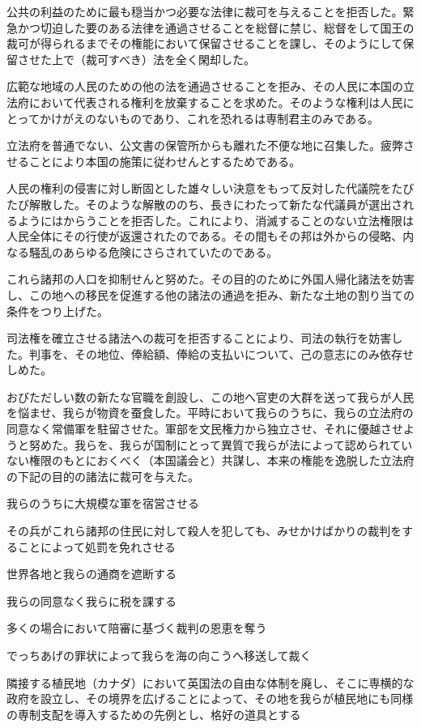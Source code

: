 公共の利益のために最も穏当かつ必要な法律に裁可を与えることを拒否した。緊急かつ切迫した要のある法律を通過させることを総督に禁じ、総督をして国王の裁可が得られるまでその権能において保留させることを課し、そのようにして保留させた上で（裁可すべき）法を全く閑却した。

広範な地域の人民のための他の法を通過させることを拒み、その人民に本国の立法府において代表される権利を放棄することを求めた。そのような権利は人民にとってかけがえのないものであり、これを恐れるは専制君主のみである。

立法府を普通でない、公文書の保管所からも離れた不便な地に召集した。疲弊させることにより本国の施策に従わせんとするためである。

人民の権利の侵害に対し断固とした雄々しい決意をもって反対した代議院をたびたび解散した。そのような解散ののち、長きにわたって新たな代議員が選出されるようにはからうことを拒否した。これにより、消滅することのない立法権限は人民全体にその行使が返還されたのである。その間もその邦は外からの侵略、内なる騒乱のあらゆる危険にさらされていたのである。

これら諸邦の人口を抑制せんと努めた。その目的のために外国人帰化諸法を妨害し、この地への移民を促進する他の諸法の通過を拒み、新たな土地の割り当ての条件をつり上げた。

司法権を確立させる諸法への裁可を拒否することにより、司法の執行を妨害した。判事を、その地位、俸給額、俸給の支払いについて、己の意志にのみ依存せしめた。

おびただしい数の新たな官職を創設し、この地へ官吏の大群を送って我らが人民を悩ませ、我らが物資を蚕食した。平時において我らのうちに、我らの立法府の同意なく常備軍を駐留させた。軍部を文民権力から独立させ、それに優越させようと努めた。我らを、我らが国制にとって異質で我らが法によって認められていない権限のもとにおくべく（本国議会と）共謀し、本来の権能を逸脱した立法府の下記の目的の諸法に裁可を与えた。

我らのうちに大規模な軍を宿営させる

  その兵がこれら諸邦の住民に対して殺人を犯しても、みせかけばかりの裁判をすることによって処罰を免れさせる

  世界各地と我らの通商を遮断する

  我らの同意なく我らに税を課する

  多くの場合において陪審に基づく裁判の恩恵を奪う

  でっちあげの罪状によって我らを海の向こうへ移送して裁く

  隣接する植民地（カナダ）において英国法の自由な体制を廃し、そこに専横的な政府を設立し、その境界を広げることによって、その地を我らが植民地にも同様の専制支配を導入するための先例とし、格好の道具とする


